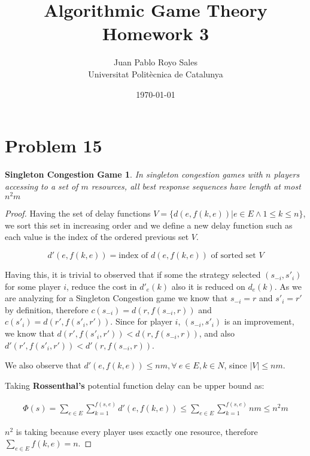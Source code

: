 \documentclass[12pt, a4paper]{article}
\title{%
  Algorithmic Game Theory \\
  Homework 3
}
\author{%
  Juan Pablo Royo Sales\\
  \small{Universitat Politècnica de Catalunya}
}
\date\today
\begin{document}
\maketitle

\section{Problem 15}
\newtheorem*{congest}{Singleton Congestion Game}

\begin{congest}
In singleton congestion games with $n$ players accessing to a set of $m$ resources, all best response sequences have length at most $n^2m$
\end{congest}
\begin{proof}
Having the set of delay functions $V = \{d(e, f(k, e)) | e \in E \land 1 \leq k \leq n \}$, we sort this set in increasing order
and we define a new delay function such as each value is the index of the ordered previous set $V$.

\begin{equation*}
  d'(e, f(k,e)) = \text{index of } d(e, f(k, e)) \text{ of sorted set } V
\end{equation*}


Having this, it is trivial to observed that if some the strategy selected $(s_{-i}, s'_i)$ for some player $i$, reduce the cost in $d'_e(k)$ also it is reduced on $d_e(k)$.
As we are analyzing for a Singleton Congestion game we know that $s_{-i} = {r}$ and $s'_i = {r'}$ by definition, therefore $c(s_{-i}) = d(r,f(s_{-i}, r))$ and $c(s'_i) = d(r',f(s'_i, r'))$.
Since for player $i$, $(s_{-i}, s'_i)$ is an improvement, we know that $d(r', f(s'_i, r')) < d(r, f(s_{-i}, r))$, and also $d'(r', f(s'_i, r')) < d'(r, f(s_{-i}, r))$.

We also observe that $d'(e, f(k,e)) \leq nm, \forall\ e \in E, k \in N$, since $|V| \leq nm$.

Taking \textbf{Rossenthal's} potential function delay can be upper bound as:

\begin{subequations}
  \begin{align}
    \Phi(s) = \sum_{e \in E} \sum_{k = 1}^{f(s,e)} d'(e,f(k,e)) \leq \sum_{e \in E} \sum_{k = 1}^{f(s,e)} nm \leq n^2m
  \end{align}
\end{subequations}

$n^2$ is taking because every player uses exactly one resource, therefore $\sum_{e \in E} f(k,e) = n$.
\end{proof}
\end{document}
